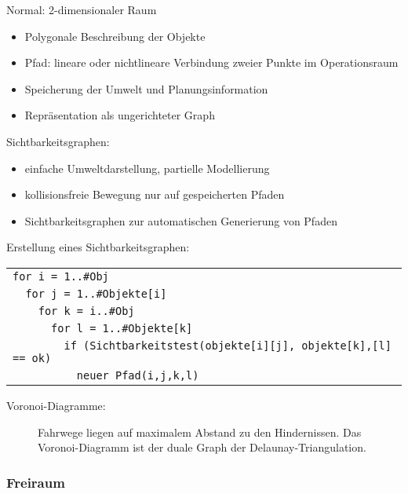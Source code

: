 Normal: 2-dimensionaler Raum
\begin{itemize}
\item Polygonale Beschreibung der Objekte
\item Pfad: lineare oder nichtlineare Verbindung zweier Punkte im Operationsraum
\item Speicherung der Umwelt und Planungsinformation
\item Repräsentation als ungerichteter Graph
\end{itemize}
Sichtbarkeitsgraphen:
\begin{itemize}
\item einfache Umweltdarstellung, partielle Modellierung
\item kollisionsfreie Bewegung nur auf gespeicherten Pfaden
\item Sichtbarkeitsgraphen zur automatischen Generierung von Pfaden
\end{itemize}
Erstellung eines Sichtbarkeitsgraphen:
\begin{center}
\begin{tabular}{l}
\verb|for i = 1..#Obj| \\
\verb|  for j = 1..#Objekte[i]| \\
\verb|    for k = i..#Obj| \\
\verb|      for l = 1..#Objekte[k]| \\
\verb|        if (Sichtbarkeitstest(objekte[i][j], objekte[k],[l] == ok)| \\
\verb|          neuer Pfad(i,j,k,l)|
\end{tabular}
\end{center}
\begin{description}
\item[Voronoi-Diagramme:] Fahrwege liegen auf maximalem Abstand zu den Hindernissen. Das Voronoi-Diagramm ist der duale Graph der Delaunay-Triangulation.
\end{description}

\subsubsection*{Freiraum}

